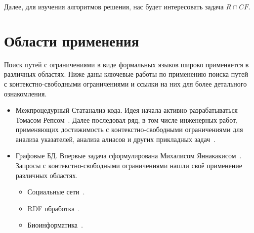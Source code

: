 Далее, для изучения алгоритмов решения, нас будет интересовать задача $R \cap CF$.

\section{Области применения}

Поиск путей с ограничениями в виде формальных языков широко применяется в различных областях.
Ниже даны ключевые работы по применению поиска путей с контекстно-свободными ограничениями и ссылки на них для более детального ознакомления.
\begin{itemize}
    \item Межпроцедурный Статанализ кода.
          Идея начала активно разрабатываться Томасом Репсом~.
          Далее последовал ряд, в том числе инженерных работ, применяющих достижимость с контекстно-свободными ограничениями для анализа указателей, анализа алиасов и других прикладных задач~.
    \item Графовые БД.
          Впервые задача сформулирована Михалисом Яннакакисом~.
          Запросы с контекстно-свободными ограничениями нашли своё применение различных областях.
          \begin{itemize}
              \item Социальные сети~.
              \item RDF обработка~.
              \item Биоинформатика~.
          \end{itemize}
\end{itemize}



%
